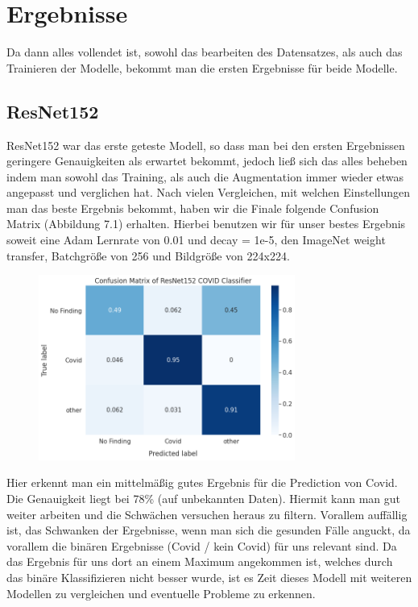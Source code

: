 \chapter{Ergebnisse}
\label{ch:results}

Da dann alles vollendet ist, sowohl das bearbeiten des Datensatzes, als auch das Trainieren der Modelle, bekommt man die ersten Ergebnisse für beide Modelle.

\section{ResNet152}

ResNet152 war das erste geteste Modell, so dass man bei den ersten Ergebnissen geringere Genauigkeiten als erwartet bekommt, jedoch ließ sich das alles beheben indem man sowohl das Training, als auch die Augmentation immer wieder etwas angepasst und verglichen hat. Nach vielen Vergleichen, mit welchen Einstellungen man das beste Ergebnis bekommt, haben wir die Finale folgende Confusion Matrix (Abbildung 7.1) erhalten. Hierbei benutzen wir für unser bestes Ergebnis soweit eine Adam Lernrate von 0.01 und decay = 1e-5, den ImageNet weight transfer, Batchgröße von 256 und Bildgröße von 224x224.

\begin{figure}[H]
    \centering
    \includegraphics[width=0.75\textwidth]{../results/ResNet152_conf_matrix.png}
    \caption{}
\end{figure}

Hier erkennt man ein mittelmäßig gutes Ergebnis für die Prediction von Covid. Die Genauigkeit liegt bei 78\% (auf unbekannten Daten). Hiermit kann man gut weiter arbeiten und die Schwächen versuchen heraus zu filtern. Vorallem auffällig ist, das Schwanken der Ergebnisse, wenn man sich die gesunden Fälle anguckt, da vorallem die binären Ergebnisse (Covid / kein Covid) für uns relevant sind. Da das Ergebnis für uns dort an einem Maximum angekommen ist, welches durch das binäre Klassifizieren nicht besser wurde, ist es Zeit dieses Modell mit weiteren Modellen zu vergleichen und eventuelle Probleme zu erkennen.

